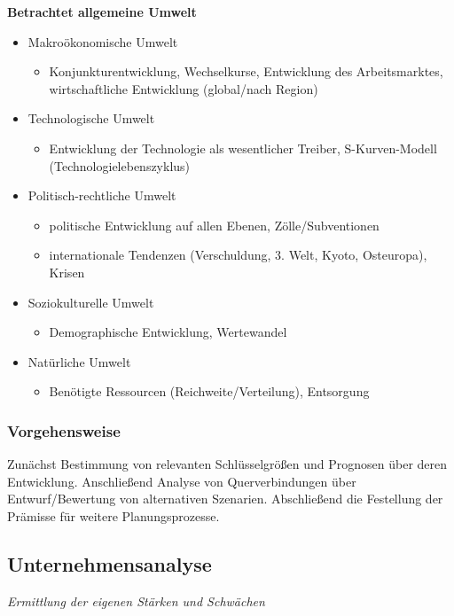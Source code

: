 \documentclass[a4paper,11pt, twoside]{article}
\begin{document}
\textbf{Betrachtet allgemeine Umwelt}
\begin{itemize}
	\item Makroökonomische Umwelt
	\begin{itemize}
		\item Konjunkturentwicklung, Wechselkurse, Entwicklung des Arbeitsmarktes, wirtschaftliche Entwicklung (global/nach Region)
	\end{itemize}
	\item Technologische Umwelt
	\begin{itemize}
		\item Entwicklung der Technologie als wesentlicher Treiber, S-Kurven-Modell (Technologielebenszyklus)
	\end{itemize}
	\item Politisch-rechtliche Umwelt
	\begin{itemize}
		\item politische Entwicklung auf allen Ebenen, Zölle/Subventionen
		\item internationale Tendenzen (Verschuldung, 3. Welt, Kyoto, Osteuropa), Krisen
	\end{itemize}
	\item Soziokulturelle Umwelt
	\begin{itemize}
		\item Demographische Entwicklung, Wertewandel
	\end{itemize}
	\item Natürliche Umwelt
	\begin{itemize}
		\item Benötigte Ressourcen (Reichweite/Verteilung), Entsorgung
	\end{itemize}
\end{itemize}

\subsubsection*{Vorgehensweise}
Zunächst Bestimmung von relevanten Schlüsselgrößen und Prognosen über deren Entwicklung. Anschließend Analyse von Querverbindungen über Entwurf/Bewertung von alternativen Szenarien. Abschließend die Festellung der Prämisse für weitere Planungsprozesse.

\subsection{Unternehmensanalyse}
\textit{Ermittlung der eigenen Stärken und Schwächen}
\end{document}
